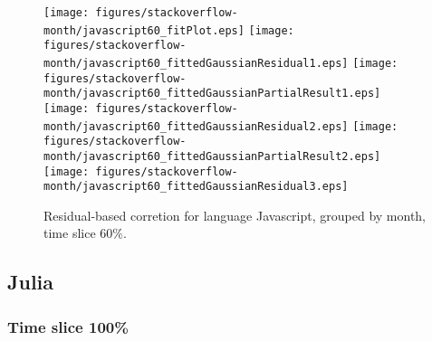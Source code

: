 \begin{figure}[t]
\centering
{}
{\texttt{[image: figures/stackoverflow-month/javascript60\_fitPlot.eps]}}
{\texttt{[image: figures/stackoverflow-month/javascript60\_fittedGaussianResidual1.eps]}}
{\texttt{[image: figures/stackoverflow-month/javascript60\_fittedGaussianPartialResult1.eps]}}
{\texttt{[image: figures/stackoverflow-month/javascript60\_fittedGaussianResidual2.eps]}}
{\texttt{[image: figures/stackoverflow-month/javascript60\_fittedGaussianPartialResult2.eps]}}
{\texttt{[image: figures/stackoverflow-month/javascript60\_fittedGaussianResidual3.eps]}}
\caption{Residual-based corretion for language Javascript, grouped by month, time slice 60\%.}
\end{figure}


\FloatBarrier


\subsection{Julia}

\subsubsection{Time slice 100\%}

